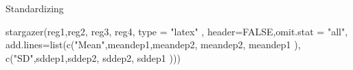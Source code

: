 \documentclass[
  ignorenonframetext,
]{beamer}
\newenvironment{Shaded}{\begin{snugshade}}{\end{snugshade}}
\newcommand{\AttributeTok}[1]{\textcolor[rgb]{0.77,0.63,0.00}{#1}}
\newcommand{\ConstantTok}[1]{\textcolor[rgb]{0.00,0.00,0.00}{#1}}
\newcommand{\FunctionTok}[1]{\textcolor[rgb]{0.00,0.00,0.00}{#1}}
\newcommand{\NormalTok}[1]{#1}
\newcommand{\StringTok}[1]{\textcolor[rgb]{0.31,0.60,0.02}{#1}}
\begin{document}
\begin{frame}[fragile]{Standardizing}
\protect\hypertarget{standardizing-7}{}
\tiny

\begin{Shaded}
\begin{Highlighting}[]
\FunctionTok{stargazer}\NormalTok{(reg1,reg2, reg3, reg4, }\AttributeTok{type =} \StringTok{"latex"}\NormalTok{ , }\AttributeTok{header=}\ConstantTok{FALSE}\NormalTok{,}\AttributeTok{omit.stat =} \StringTok{"all"}\NormalTok{,}
          \AttributeTok{add.lines=}\FunctionTok{list}\NormalTok{(}\FunctionTok{c}\NormalTok{(}\StringTok{"Mean"}\NormalTok{,meandep1,meandep2, meandep2, meandep1 ),}
                         \FunctionTok{c}\NormalTok{(}\StringTok{"SD"}\NormalTok{,sddep1,sddep2, sddep2, sddep1 )))}
\end{Highlighting}
\end{Shaded}


\end{frame}
\end{document}
